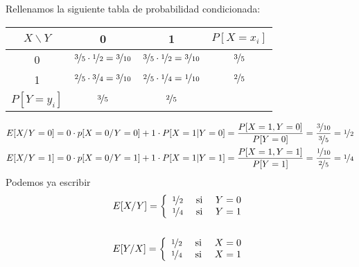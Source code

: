 \begin{ejercicio}
    Rellenamos la siguiente tabla de probabilidad condicionada:
    \begin{center}
        \begin{tabular}{c | c c | c}
            $X\backslash Y$ & 0 & 1 & $P[X=x_i]$\\
            \hline
            0 & $\nicefrac{3}{5} \cdot \nicefrac{1}{2} = \nicefrac{3}{10}$ & $\nicefrac{3}{5}\cdot \nicefrac{1}{2} = \nicefrac{3}{10}$ & $\nicefrac{3}{5}$\\
            1 & $\nicefrac{2}{5}\cdot \nicefrac{3}{4} = \nicefrac{3}{10}$ & $\nicefrac{2}{5}\cdot \nicefrac{1}{4} = \nicefrac{1}{10}$ & $\nicefrac{2}{5}$\\
            \hline
            $P[Y=y_i]$ & $\nicefrac{3}{5}$ & $\nicefrac{2}{5}$ & \\
        \end{tabular}
    \end{center}
    \begin{align*}
        E[X/Y=0] &= 0 \cdot p[X=0 / Y=0] + 1 \cdot P[X=1 | Y=0] = \frac{P[X=1, Y=0]}{P[Y=0]} = \frac{\nicefrac{3}{10}}{\nicefrac{3}{5}} = \nicefrac{1}{2} \\
        E[X/Y=1] &= 0 \cdot p[X=0 / Y=1] + 1 \cdot P[X=1 | Y=1] = \frac{P[X=1, Y=1]}{P[Y=1]} = \frac{\nicefrac{1}{10}}{\nicefrac{2}{5}} = \nicefrac{1}{4} \\
    \end{align*}
    Podemos ya escribir 
    \begin{gather*}
        E[X/Y] = \left\{
        \begin{array}{ccc}
            \nicefrac{1}{2} & \text{ si } & Y=0\\
            \nicefrac{1}{4} & \text{ si } & Y=1
        \end{array}
        \right.\\\\
        E[Y/X] = \left\{
        \begin{array}{ccc}
            \nicefrac{1}{2} & \text{ si } & X=0\\
            \nicefrac{1}{4} & \text{ si } & X=1
        \end{array}
        \right.
    \end{gather*}
\end{ejercicio}

